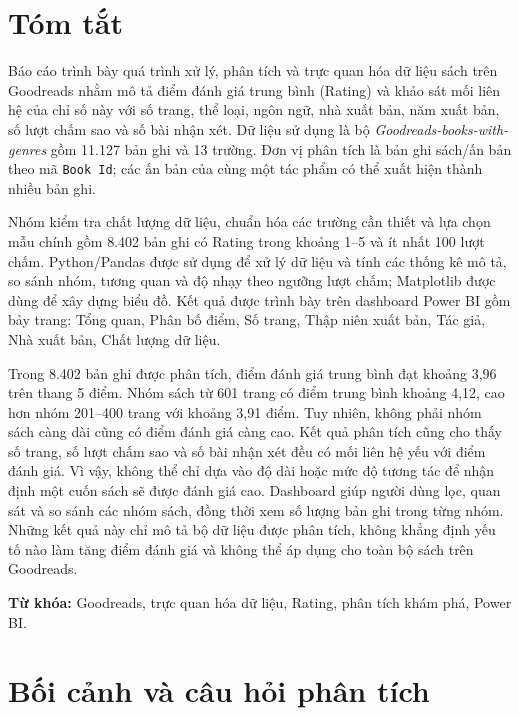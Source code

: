 \documentclass[11pt,a4paper]{article}
\newcommand{\Dataset}{\textit{Goodreads-books-with-genres}}
\begin{document}
\section*{Tóm tắt}
Báo cáo trình bày quá trình xử lý, phân tích và trực quan hóa dữ liệu sách trên Goodreads nhằm mô tả điểm đánh giá trung bình (Rating) và khảo sát mối liên hệ của chỉ số này với số trang, thể loại, ngôn ngữ, nhà xuất bản, năm xuất bản, số lượt chấm sao và số bài nhận xét. Dữ liệu sử dụng là bộ \Dataset{} gồm 11.127 bản ghi và 13 trường. Đơn vị phân tích là bản ghi sách/ấn bản theo mã \texttt{Book Id}; các ấn bản của cùng một tác phẩm có thể xuất hiện thành nhiều bản ghi.

Nhóm kiểm tra chất lượng dữ liệu, chuẩn hóa các trường cần thiết và lựa chọn mẫu chính gồm 8.402 bản ghi có Rating trong khoảng 1--5 và ít nhất 100 lượt chấm. Python/Pandas được sử dụng để xử lý dữ liệu và tính các thống kê mô tả, so sánh nhóm, tương quan và độ nhạy theo ngưỡng lượt chấm; Matplotlib được dùng để xây dựng biểu đồ. Kết quả được trình bày trên dashboard Power BI gồm bảy trang: Tổng quan, Phân bố điểm, Số trang, Thập niên xuất bản, Tác giả, Nhà xuất bản, Chất lượng dữ liệu.

Trong 8.402 bản ghi được phân tích, điểm đánh giá trung bình đạt khoảng 3,96 trên thang 5 điểm. Nhóm sách từ 601 trang có điểm trung bình khoảng 4,12, cao hơn nhóm 201–400 trang với khoảng 3,91 điểm. Tuy nhiên, không phải nhóm sách càng dài cũng có điểm đánh giá càng cao. Kết quả phân tích cũng cho thấy số trang, số lượt chấm sao và số bài nhận xét đều có mối liên hệ yếu với điểm đánh giá. Vì vậy, không thể chỉ dựa vào độ dài hoặc mức độ tương tác để nhận định một cuốn sách sẽ được đánh giá cao. Dashboard giúp người dùng lọc, quan sát và so sánh các nhóm sách, đồng thời xem số lượng bản ghi trong từng nhóm. Những kết quả này chỉ mô tả bộ dữ liệu được phân tích, không khẳng định yếu tố nào làm tăng điểm đánh giá và không thể áp dụng cho toàn bộ sách trên Goodreads.

\noindent\textbf{Từ khóa:} Goodreads, trực quan hóa dữ liệu, Rating, phân tích khám phá, Power BI.

\clearpage
\begingroup
\setlength{\parskip}{0pt}
\tableofcontents
\endgroup
\clearpage
\begingroup\setlength{\parskip}{0pt}
\listoftables
\clearpage
\listoffigures
\endgroup
\clearpage
{}

\section{Bối cảnh và câu hỏi phân tích}
\end{document}
